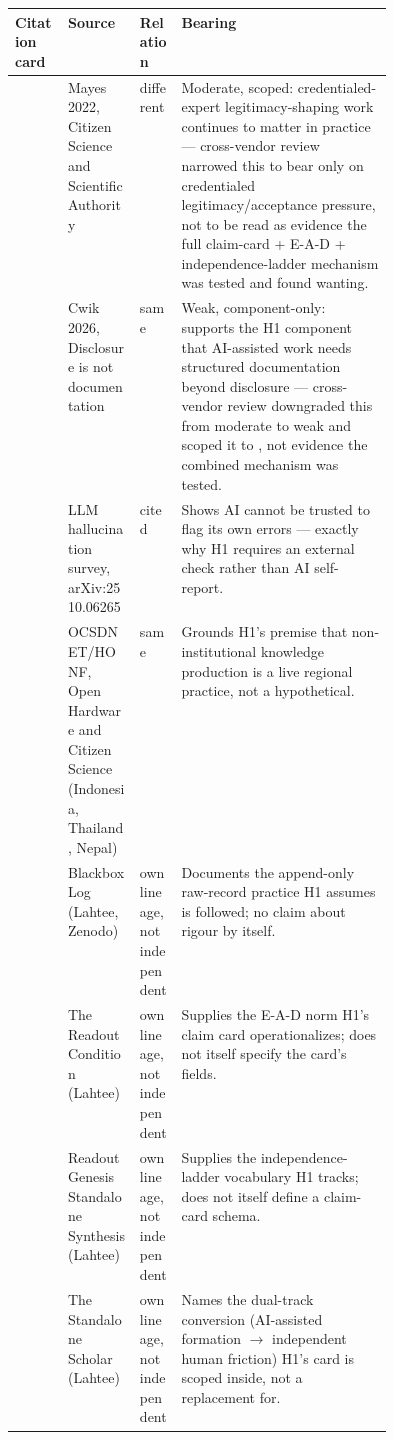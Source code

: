 \documentclass[10pt,twocolumn]{article}
\renewcommand{\texttt}[1]{\seqsplit{#1}}%
\begin{document}
\begin{table}[t]
\centering
\scriptsize
\begin{tabularx}{\linewidth}{@{}p{0.145\linewidth} p{0.19\linewidth} p{0.11\linewidth} X@{}}
\toprule
\textbf{Citation card} & \textbf{Source} & \textbf{Relation} & \textbf{Bearing} \\
\midrule
\cite{cite-cstp-boundary-work-001} & Mayes 2022, Citizen Science and Scientific Authority & different & Moderate, scoped: credentialed-expert legitimacy-shaping work continues to matter in practice --- cross-vendor review narrowed this to bear only on credentialed legitimacy/acceptance pressure, not to be read as evidence the full claim-card + E-A-D + independence-ladder mechanism was tested and found wanting. \\
\cite{cite-disclosure-not-documentation-001} & Cwik 2026, Disclosure is not documentation & same & Weak, component-only: supports the H1 component that AI-assisted work needs structured documentation beyond disclosure --- cross-vendor review downgraded this from moderate to weak and scoped it to \texttt{SUPPORTS\_COMPONENT\_ONLY}, not evidence the combined mechanism was tested. \\
\cite{cite-llm-hallucination-survey-001} & LLM hallucination survey, arXiv:2510.06265 & cited & Shows AI cannot be trusted to flag its own errors --- exactly why H1 requires an external check rather than AI self-report. \\
\cite{cite-ocsdnet-honf-001} & OCSDNET/HONF, Open Hardware and Citizen Science (Indonesia, Thailand, Nepal) & same & Grounds H1's premise that non-institutional knowledge production is a live regional practice, not a hypothetical. \\
\cite{cite-own-blackbox-log-h1-006} & Blackbox Log (Lahtee, Zenodo) & own lineage, not independent & Documents the append-only raw-record practice H1 assumes is followed; no claim about rigour by itself. \\
\cite{cite-own-readout-condition-h1-002} & The Readout Condition (Lahtee) & own lineage, not independent & Supplies the E-A-D norm H1's claim card operationalizes; does not itself specify the card's fields. \\
\cite{cite-own-readout-genesis-h1-003} & Readout Genesis Standalone Synthesis (Lahtee) & own lineage, not independent & Supplies the independence-ladder vocabulary H1 tracks; does not itself define a claim-card schema. \\
\cite{cite-own-standalone-scholar-h1-005} & The Standalone Scholar (Lahtee) & own lineage, not independent & Names the dual-track conversion (AI-assisted formation $\to$ independent human friction) H1's card is scoped inside, not a replacement for. \\

\end{tabularx}
\end{table}
\end{document}

